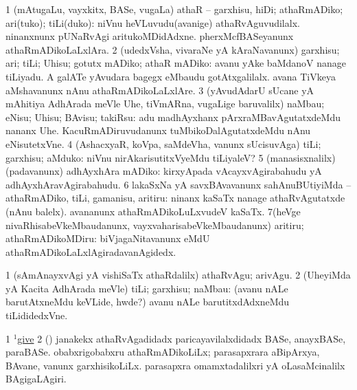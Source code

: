\noindent
\gl{\sakirx}
\expl{}
\bmng
\bnum
\num{1} (mAtugaLu, vayxkitx, BASe, \mo vugaLa) athaR -- garxhisu, hiDi; athaRmADiko; ari(tuko); tiLi(duko):  niVnu heVLuvudu(avanige) athaRvAguvudilalx.  ninanxnunx pUNaRvAgi aritukoMDidAdxne.  pherxMcfBASeyanunx athaRmADikoLaLxlAra. 
\num{2} (udedxVsha, vivaraNe yA kAraNavanunx) garxhisu; ari; tiLi; Uhisu; gotutx mADiko; athaR mADiko:  avanu yAke baMdanoV nanage tiLiyadu.  A galATe yAvudara bagegx eMbaudu gotAtxgalilalx.  avana TiVkeya aMshavanunx nAnu athaRmADikoLaLxlAre. 
\num{3} (yAvudAdarU sUcane yA mAhitiya AdhArada meVle Uhe, tiVmARna, \mo vugaLige baruvalilx) naMbau; eNisu; Uhisu; BAvisu; takiRsu:  adu madhAyxhanx pArxraMBavAgutatxdeMdu nananx Uhe.  KacuRmADiruvudanunx tuMbikoDalAgutatxdeMdu nAnu eNisutetxVne. 
\num{4} (AshacxyaR, koVpa, saMdeVha, \mo vanunx sUcisuvAga) tiLi; garxhisu; aMduko:  niVnu nirAkarisutitxVyeMdu tiLiyaleV? 
\num{5} (manasisxnalilx) (padavanunx) adhAyxhAra mADiko:  kirxyApada vAcayxvAgirabahudu yA adhAyxhAravAgirabahudu. 
\num{6} lakaSxNa yA savxBAvavanunx sahAnuBUtiyiMda -- athaRmADiko, tiLi, gamanisu, aritiru:  ninanx kaSaTx nanage athaRvAgutatxde (nAnu balelx).  avananunx athaRmADikoLuLxvudeV kaSaTx. 
\num{7}(heVge nivaRhisabeVkeMbaudanunx, vayxvaharisabeVkeMbaudanunx) aritiru; athaRmADikoMDiru:  biVjagaNitavanunx eMdU athaRmADikoLaLxlAgiradavanAgidedx. 
\enum
\emng

\noindent
\gl{\akirx}
\expl{}
\bmng
\bnum
\num{1} (sAmAnayxvAgi yA vishiSaTx athaRdalilx) athaRvAgu; arivAgu. 
\num{2} (UheyiMda yA Kacita AdhArada meVle) tiLi; garxhisu; naMbau:  (avanu nALe barutAtxneMdu keVLide, hwde?) avanu nALe barutitxdAdxneMdu tiLididedxVne. 
\enum
\emng

\noindent
\gl{\pagu}
\expl{}
\bmng
\bnum
\num{1} \hyperref{kandict_g.pdf}{G}{give(1) pagu(16)}{$^1$give}  
\num{2}  (\pArxparx) janakekx athaRvAgadidadx paricayavilalxdidadx BASe, anayxBASe, paraBASe. 
  
\banum
{} obabxrigobabxru athaRmADikoLiLx; parasapxrara aBipArxya, BAvane, \mo vanunx garxhisikoLiLx. 
 parasapxra omamxtadalilxri yA oLasaMcinalilx BAgigaLAgiri. 
\eanum
\numie
\enum
\emng
\eentry

